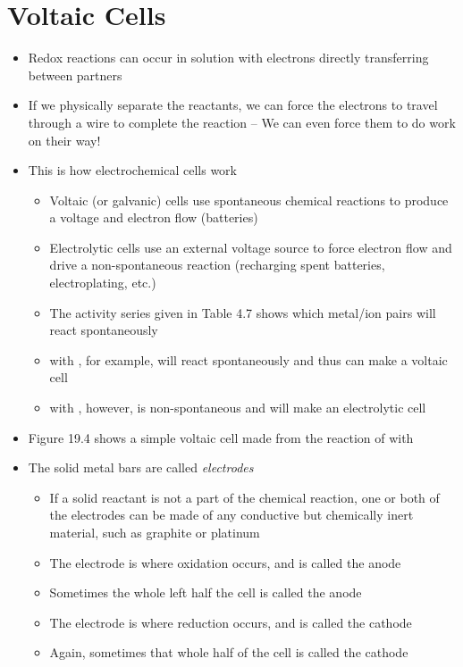 \documentclass[12pt, openany, letterpaper]{memoir}
\begin{document}
\section{Voltaic Cells}
\begin{itemize}
	\item Redox reactions can occur in solution with electrons directly transferring between partners
	\item If we physically separate the reactants, we can force the electrons to travel through a wire to complete the reaction -- We can even force them to do work on their way!
	\item This is how electrochemical cells work
	\begin{itemize}
		\item Voltaic (or galvanic) cells use spontaneous chemical reactions to produce a voltage and electron flow (batteries)
		\item Electrolytic cells use an external voltage source to force electron flow and drive a non-spontaneous reaction (recharging spent batteries, electroplating, etc.)
		\item The activity series given in Table 4.7 shows which metal/ion pairs will react spontaneously
		\item {} with , for example, will react spontaneously and thus can make a voltaic cell
		\item {} with , however, is non-spontaneous and will make an electrolytic cell
	\end{itemize}
 	\item Figure 19.4 shows a simple voltaic cell made from the reaction of  with 
 	\item The solid metal bars are called \emph{electrodes}
 	\begin{itemize}
 		\item If a solid reactant is not a part of the chemical reaction, one or both of the electrodes can be made of any conductive but chemically inert material, such as graphite or platinum
 		\item The  electrode is where oxidation occurs, and is called the anode
 		\item Sometimes the whole left half the cell is called the anode
 		\item The  electrode is where reduction occurs, and is called the cathode
 		\item Again, sometimes that whole half of the cell is called the cathode

\end{itemize}
\end{itemize}
\end{document}
